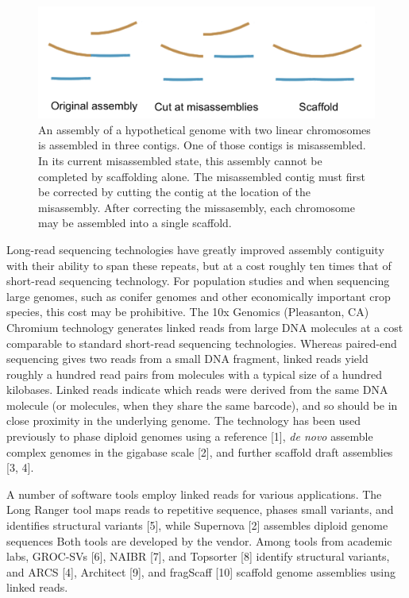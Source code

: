 \documentclass{bmcart}
\begin{document}
\begin{figure}[h!t]
\hypertarget{fig:diagram}{%
\centering
\includegraphics[width=4.8in]{figures/diagram.png}
\caption{An assembly of a hypothetical genome with two linear chromosomes is assembled in three contigs. One of those contigs is misassembled. In its current misassembled state, this assembly cannot be completed by scaffolding alone. The misassembled contig must first be corrected by cutting the contig at the location of the misassembly. After correcting the missasembly, each chromosome may be assembled into a single scaffold.}\label{fig:diagram}
}
\end{figure}

Long-read sequencing technologies have greatly improved assembly contiguity with their ability to span these repeats, but at a cost roughly ten times that of short-read sequencing technology. For population studies and when sequencing large genomes, such as conifer genomes and other economically important crop species, this cost may be prohibitive. The 10x Genomics (Pleasanton, CA) Chromium technology generates linked reads from large DNA molecules at a cost comparable to standard short-read sequencing technologies. Whereas paired-end sequencing gives two reads from a small DNA fragment, linked reads yield roughly a hundred read pairs from molecules with a typical size of a hundred kilobases. Linked reads indicate which reads were derived from the same DNA molecule (or molecules, when they share the same barcode), and so should be in close proximity in the underlying genome. The technology has been used previously to phase diploid genomes using a reference {[}1{]}, \emph{de novo} assemble complex genomes in the gigabase scale {[}2{]}, and further scaffold draft assemblies {[}3, 4{]}.

A number of software tools employ linked reads for various applications. The Long Ranger tool maps reads to repetitive sequence, phases small variants, and identifies structural variants {[}5{]}, while Supernova {[}2{]} assembles diploid genome sequences Both tools are developed by the vendor. Among tools from academic labs, GROC-SVs {[}6{]}, NAIBR {[}7{]}, and Topsorter {[}8{]} identify structural variants, and ARCS {[}4{]}, Architect {[}9{]}, and fragScaff {[}10{]} scaffold genome assemblies using linked reads.
\end{document}
